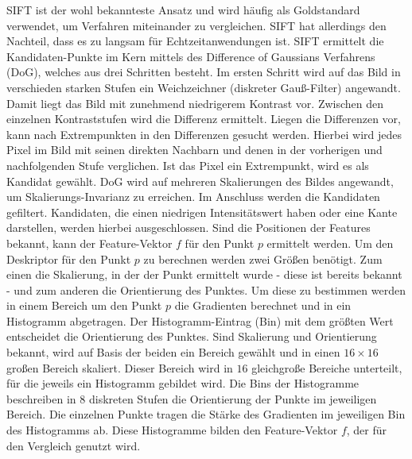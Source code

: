 \documentclass[12pt,titlepage, twoside]{article}
\begin{document}
SIFT \cite{Sift} ist der wohl bekannteste Ansatz und wird häufig als Goldstandard verwendet, um Verfahren miteinander zu vergleichen. SIFT hat allerdings den Nachteil, dass es zu langsam für Echtzeitanwendungen ist.
SIFT ermittelt die Kandidaten-Punkte im Kern mittels des Difference of Gaussians Verfahrens (DoG), welches aus drei Schritten besteht. Im ersten Schritt wird auf das Bild in verschieden starken Stufen ein Weichzeichner (diskreter Gauß-Filter) angewandt.
Damit liegt das Bild mit zunehmend niedrigerem Kontrast vor. Zwischen den einzelnen Kontraststufen wird die Differenz ermittelt. Liegen die Differenzen vor, kann nach Extrempunkten in den Differenzen gesucht werden.
Hierbei wird jedes Pixel im Bild mit seinen direkten Nachbarn und denen in der vorherigen und nachfolgenden Stufe verglichen. Ist das Pixel ein Extrempunkt, wird es als Kandidat gewählt.
DoG wird auf mehreren Skalierungen des Bildes angewandt, um Skalierungs-Invarianz zu erreichen.
Im Anschluss werden die Kandidaten gefiltert. Kandidaten, die einen niedrigen Intensitätswert haben oder eine Kante darstellen, werden hierbei ausgeschlossen.
Sind die Positionen der Features bekannt, kann der Feature-Vektor $f$ für den Punkt $p$ ermittelt werden. 
Um den Deskriptor für den Punkt $p$ zu berechnen werden zwei Größen benötigt. Zum einen die Skalierung, in der der Punkt ermittelt wurde - diese ist bereits bekannt - und zum anderen die Orientierung des Punktes.
Um diese zu bestimmen werden in einem Bereich um den Punkt $p$ die Gradienten berechnet und in ein Histogramm abgetragen. Der Histogramm-Eintrag (Bin) mit dem größten Wert entscheidet die Orientierung des Punktes.
Sind Skalierung und Orientierung bekannt, wird auf Basis der beiden ein Bereich gewählt und in einen $16\times 16$ großen Bereich skaliert. 
Dieser Bereich wird in $16$ gleichgroße Bereiche unterteilt, für die jeweils ein Histogramm gebildet wird. 
Die Bins der Histogramme beschreiben in $8$ diskreten Stufen die Orientierung der Punkte im jeweiligen Bereich. 
Die einzelnen Punkte tragen die Stärke des Gradienten im jeweiligen Bin des Histogramms ab.
Diese Histogramme bilden den Feature-Vektor $f$, der für den Vergleich genutzt wird.
\end{document}

